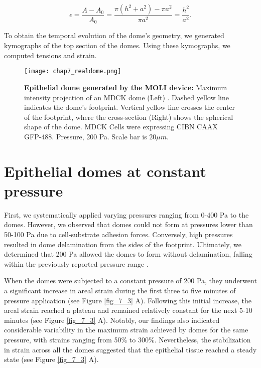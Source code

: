 \begin{equation}
	\label{eqn:arealstrain}
	\epsilon = \frac{A - A_{0}}{A_{0}} = \frac{\pi(h^2 + a^2) - \pi a^2}{\pi a^2} = \frac{h^2}{a^2} .
\end{equation}

To obtain the temporal evolution of the dome’s geometry, we generated kymographs of the top section of the domes. Using these kymographs, we computed tensions and strain.

\begin{figure}
	\centering
	\texttt{[image: chap7\_realdome.png]}
	\caption{\textbf{Epithelial dome generated by the MOLI device:} Maximum intensity projection of an MDCK dome (Left) . Dashed yellow line indicates the dome's footprint. Vertical yellow line crosses the center of the footprint, where the cross-section   (Right) shows the spherical shape of the dome. MDCK Cells were expressing CIBN CAAX GFP-488. Pressure, 200 Pa. Scale bar is $20 \mu m$.
	} \label{fig_7_1}
\end{figure}

\hypertarget{epithelial-domes-at-constant-pressure}{%
	\section{Epithelial domes at constant
		pressure}\label{epithelial-domes-at-constant-pressure}}

First, we systematically applied varying pressures ranging from 0-400 \unit{\pascal} to the domes. However, we observed that domes could not form at pressures lower than 50-100 \unit{\pascal} due to cell-substrate adhesion forces. Conversely, high pressures resulted in dome delamination from the sides of the footprint. Ultimately, we determined that 200 \unit{\pascal} allowed the domes to form without delamination, falling within the previously reported pressure range  \cite{choudhury2022,marin-llaurado2022}.

When the domes were subjected to a constant pressure of 200 \unit{\pascal}, they underwent a significant increase in areal strain during the first three to five minutes of pressure application (see Figure \ref{fig_7_3} A). Following this initial increase, the areal strain reached a plateau and remained relatively constant for the next 5-10 minutes (see Figure \ref{fig_7_3} A). Notably, our findings also indicated considerable variability in the maximum strain achieved by domes for the same pressure, with strains ranging from 50\% to 300\%. Nevertheless, the stabilization in strain across all the domes suggested that the epithelial tissue reached a steady state (see Figure \ref{fig_7_3} A).

